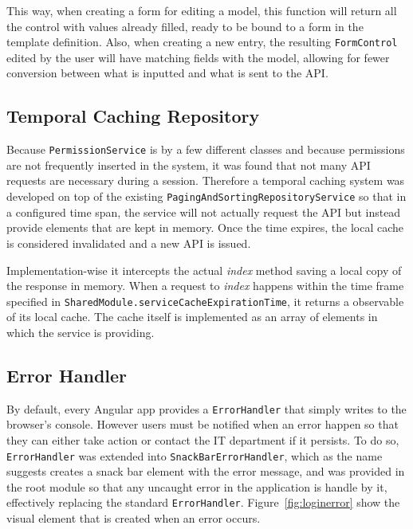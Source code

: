 This way, when creating a form for editing a model, this function will return all the control with values already filled, ready to be bound to a form in the template definition. Also, when creating a new entry, the resulting \texttt{FormControl} edited by the user will have matching fields with the model, allowing for fewer conversion between what is inputted and what is sent to the \gls{API}.

\subsection{Temporal Caching Repository}\label{tcr}
Because \texttt{PermissionService} is by a few different classes and because permissions are not frequently inserted in the system, it was found that not many \gls{API} requests are necessary during a session. Therefore a temporal caching system was developed on top of the existing \texttt{PagingAndSortingRepositoryService} so that in a configured time span, the service will not actually request the \gls{API} but instead provide elements that are kept in memory. Once the time expires, the local cache is considered invalidated and a new \gls{API} is issued.

Implementation-wise it intercepts the actual \textit{index} method saving a local copy of the response in memory. When a request to \textit{index} happens within the time frame specified in \texttt{SharedModule.serviceCacheExpirationTime}, it returns a observable of its local cache. The cache itself is implemented as an array of elements in which the service is providing.

\subsection{Error Handler}\label{error:handler}
By default, every Angular app provides a \texttt{ErrorHandler} that simply writes to the browser's console. However users must be notified when an error happen so that they can either take action or contact the IT department if it persists. To do so, \texttt{ErrorHandler} was extended into \texttt{SnackBarErrorHandler}, which as the name suggests creates a snack bar element with the error message, and was provided in the root module so that any uncaught error in the application is handle by it, effectively replacing the standard \texttt{ErrorHandler}. Figure~\ref{fig:loginerror} show the visual element that is created when an error occurs.

